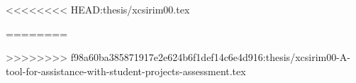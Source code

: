 \documentclass[english,odsaz]{fitthesis} %
\begin{document}
  \maketitle
  \setlength{\parskip}{0pt}

  {\hypersetup{hidelinks}\tableofcontents}
  
  \ifczech
    \renewcommand\listfigurename{Seznam obrázků}
  \fi
  \ifslovak
    \renewcommand\listfigurename{Zoznam obrázkov}
  \fi
  {\hypersetup{hidelinks}\listoffigures}
  
  \ifczech
    \renewcommand\listtablename{Seznam tabulek}
  \fi
  \ifslovak
    \renewcommand\listtablename{Zoznam tabuliek}
  \fi



  \ifODSAZ
    \setlength{\parskip}{0.5\bigskipamount}
  \else
    \setlength{\parskip}{0pt}
  \fi

  \iftwoside
    \cleardoublepage
  \fi

  \ifenglish
<<<<<<<< HEAD:thesis/xcsirim00.tex
    
  \else
    
========
    
  \else
    
>>>>>>>> f98a60ba385871917e2e624b6f1def14c6e4d916:thesis/xcsirim00-A-tool-for-assistance-with-student-projects-assessment.tex
  \fi
  
\end{document}
